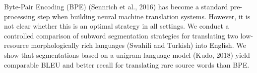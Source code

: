 Byte-Pair Encoding (BPE) (Sennrich et al., 2016) has become a standard pre-processing step when building neural machine translation systems. However, it is not clear whether this is an optimal strategy in all settings. We conduct a controlled comparison of subword segmentation strategies for translating two low-resource morphologically rich languages (Swahili and Turkish) into English. We show that segmentations based on a unigram language model (Kudo, 2018) yield comparable BLEU and better recall for translating rare source words than BPE.

